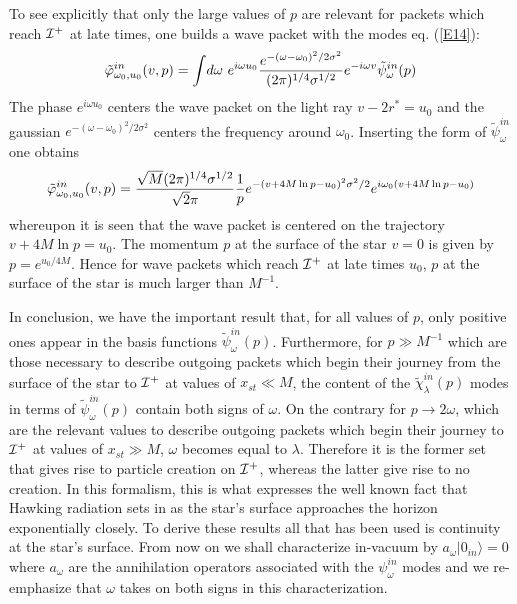 \documentclass[12pt]{article}
\begin{document}
To see explicitly that only the large values of $p$ are relevant for
packets which reach ${\cal I}^+$ at late times, one 
builds a wave packet with the modes eq. (\ref{E14}):
\begin{equation}
\tilde \varphi^{in}_{\omega_0, u_0}(v,p) 
=
\int\! d \omega \ e^{i\omega u_0}{ e^{-(\omega - \omega_0)^2/ 2 \sigma^2}
 \over ({2 \pi})^{1/4} \sigma^{1/2}}
e^{-i \omega v} {\tilde
{\psi}}_\omega ^{in} (p)
\label{E15B}
\end{equation}
The phase $e^{i\omega u_0}$ centers the wave packet on the light ray
$v-2r^* = u_0$ and the gaussian $
e^{-(\omega - \omega_0)^2/ 2 \sigma^2}$ centers the frequency around
$\omega_0$. Inserting the form of ${\tilde
{\psi}}_\omega ^{in} $ one obtains
\begin{equation}
\tilde \varphi^{in}_{\omega_0, u_0} (v,p)
=
{\sqrt{M} ({2 \pi})^{1/4} \sigma^{1/2}\over \sqrt{2} \pi}
{1 \over p}
e^{-(v + 4M \ln p -u_0)^2 \sigma^2/2}
e^{i \omega_0(v + 4M \ln p -u_0)}
\label{E15C}
\end{equation}
whereupon it is seen that the wave packet is centered on the trajectory
$v + 4M \ln p =u_0$. The momentum $p$ at the surface of the star $v=0$
is given by $p= e^{u_0/4M}$. Hence for wave packets which reach ${\cal
I}^+$ at late times $u_0$,  $p$ at the surface of the star is
much larger than $M^{-1}$.


In conclusion, we have the important result that, for all values of $p$, only
positive ones appear in the basis functions $ {\tilde{\psi}}_\omega^{in} (p)$.
Furthermore, for $ p \gg M^{-1}$ which are those necessary to
describe outgoing packets which begin their journey from the surface of the
star to $ {\cal I}^+$ at values of $  x_{st} \ll M$, the content of the $
{\tilde{\chi}}_\lambda^{in} (p)$ modes in terms of $ {\tilde{\psi}}_\omega ^{in}
(p)$ contain both signs of $ \omega$. On the contrary for $ p \to  2 \omega$,
which are the relevant values to describe outgoing packets which begin their
journey to $ {\cal I}^+$ at values of $  x_{st} \gg M$, $\omega $ becomes equal
to $\lambda$. Therefore it is the former set that gives rise to particle 
creation
on  $ {\cal I}^+$, whereas the latter give rise to no creation. In this
formalism, this is what expresses the well known fact that Hawking radiation
sets in as the star's surface approaches the horizon exponentially closely. To
derive these results all that has been used is continuity at the star's
surface. From now on we shall characterize in-vacuum by $ a_\omega \vert
{0_{in}} \rangle= 0$ where $ a_\omega$ are the annihilation operators
associated with the $ \psi_\omega^{in}$ modes and we re-emphasize that $
\omega$ takes on both signs in this characterization.
\end{document}
